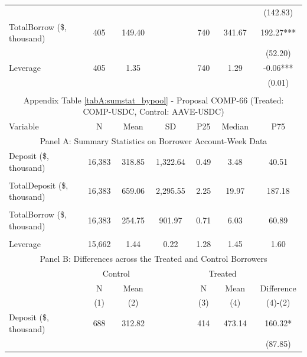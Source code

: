 \begin{table}[ht!]
\begin{tabular*}{\linewidth}{@{\extracolsep{\fill}}lcccccc }
          &       &       &       &       &       & (142.83) \\
    TotalBorrow (\$, thousand) & 405   & 149.40 &       & 740   & 341.67 & 192.27*** \\
          &       &       &       &       &       & (52.20) \\
    Leverage & 405   & 1.35  &       & 740   & 1.29  & -0.06*** \\
          &       &       &       &       &       & (0.01) \\
    \bottomrule
              &       &       &       &       &       &  \\
      \multicolumn{7}{c}{Appendix Table \ref{tabA:sumstat_bypool} - Proposal COMP-66 (Treated: COMP-USDC, Control: AAVE-USDC)} \\
       \toprule
     Variable  &N & Mean & SD & P25 & Median & P75 \\
     \midrule
    \multicolumn{7}{c}{Panel A: Summary Statistics on Borrower Account-Week Data} \\
    \midrule
    Deposit (\$, thousand) & 16,383 & 318.85 & 1,322.64 & 0.49  & 3.48  & 40.51 \\
          &       &       &       &       &       &  \\
    TotalDeposit (\$, thousand) & 16,383 & 659.06 & 2,295.55 & 2.25  & 19.97 & 187.18 \\
          &       &       &       &       &       &  \\
    TotalBorrow (\$, thousand) & 16,383 & 254.75 & 901.97 & 0.71  & 6.03  & 60.89 \\
          &       &       &       &       &       &  \\
    Leverage & 15,662 & 1.44  & 0.22  & 1.28  & 1.45  & 1.60 \\
    \midrule
        \multicolumn{7}{c}{Panel B: Differences across the Treated and Control Borrowers} \\
\midrule
          & \multicolumn{2}{c}{Control} &       & \multicolumn{2}{c}{Treated} &  \\
\cmidrule{2-3}\cmidrule{5-6}          & N & Mean &       & N & Mean & Difference \\
\cmidrule{2-3}\cmidrule{5-6}          & (1) & (2) &       & (3) & (4) & (4)-(2) \\
\cmidrule{2-7}    Deposit (\$, thousand) & 688   & 312.82 &       & 414   & 473.14 & 160.32* \\
          &       &       &       &       &       & (87.85) \\

\end{tabular*}
\end{table}
